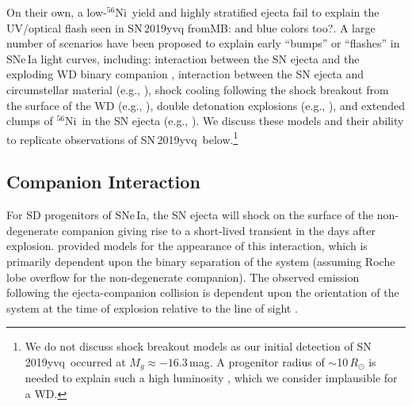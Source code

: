 \documentclass[twocolumn]{aastex63}
\newcommand{\frommb}[1]{{\color{purple} fromMB: {#1}}}
\newcommand{\radni}{$^{56}$Ni}
\newcommand{\sn}{SN\,2019yvq}
\begin{document}
On their own, a low-\radni\ yield and highly stratified ejecta fail to explain
the UV/optical flash seen in \sn \frommb{and blue colors too?}. A large number of scenarios have been
proposed to explain early ``bumps'' or ``flashes'' in SNe\,Ia light curves,
including: interaction between the SN ejecta and the exploding WD binary
companion \citep{Kasen10a}, interaction between the SN ejecta and
circumstellar material (e.g., \citealt{Dessart14,Piro16}), shock cooling
following the shock breakout from the surface of the WD (e.g.,
\citealt{Piro10,Rabinak11}), double detonation explosions (e.g.,
\citealt{Noebauer17,Polin19}), and extended clumps of \radni\ in the SN ejecta
(e.g., \citealt{Shappee19,Dimitriadis19}). We discuss these models and their
ability to replicate observations of \sn\ below.\footnote{We do not discuss
shock breakout models as our initial detection of \sn\ occurred at $M_g
\approx -16.3$\,mag. A progenitor radius of $\sim$10$\,R_\odot$ is needed to
explain such a high luminosity \citep{Piro10,Rabinak11}, which we consider
implausible for a WD.}

\subsection{Companion Interaction}

For SD progenitors of SNe\,Ia, the SN ejecta will shock on the surface of the
non-degenerate companion giving rise to a short-lived transient in the days
after explosion. \citet{Kasen10a} provided models for the appearance of this
interaction, which is primarily dependent upon the binary separation of the
system (assuming Roche lobe overflow for the non-degenerate companion). The
observed emission following the ejecta-companion collision is dependent upon
the orientation of the system at the time of explosion relative to the line of
sight \citep{Kasen10a}.
\end{document}
